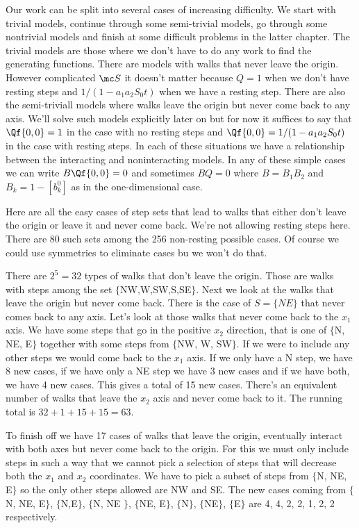 Our work can be split into several cases of increasing difficulty. We start with trivial models, continue through some semi-trivial models, go through some nontrivial models and finish at some difficult problems in the latter chapter. The trivial models are those where we don't have to do any work to find the generating functions. There are models with walks that never leave the origin. However complicated $\mc S$ it doesn't matter because $Q = 1$ when we don't have resting steps and $1/(1-a_1a_2S_0t)$ when we have a resting step. There are also the semi-triviall models where walks leave the origin but never come back to any axis. We'll solve such models explicitly later on but for now it suffices to say that $\Qf{0,0} = 1$ in the case with no resting steps and $\Qf{0,0} = 1/(1-a_1a_2S_0t)$ in the case with resting steps. In each of these situations we have a relationship between the interacting and noninteracting models. In any of these simple cases we can write $B\Qf{0,0} = 0$ and sometimes $BQ = 0$ where $B = B_1 B_2$ and $B_k = 1-[b_k^0]$ as in the one-dimensional case.

Here are all the easy cases of step sets that lead to walks that either don't leave the origin or leave it and never come back. We're not allowing resting steps here. There are 80 such sets among the 256 non-resting possible cases. Of course we could use symmetries to eliminate cases bu we won't do that.

There are $2^5 = 32$ types of walks that don't leave the origin. Those are walks with steps among the set $\{$NW,W,SW,S,SE$\}$. Next we look at the walks that leave the origin but never come back.  There is the case of $S = \{NE\}$ that never comes back to any axis. Let's look at those walks that never come back to the $x_1$ axis. We have some steps that go in the positive $x_2$ direction, that is one of $\{$N, NE, E$\}$ together with some steps from $\{$NW, W, SW$\}$. If we were to include any other steps we would come back to the $x_1$ axis. If we only have a N step, we have 8 new cases, if we have only a NE step we have 3 new cases and if we have both, we have 4 new cases. This gives a total of 15 new cases. There's an equivalent number of walks that leave the $x_2$ axis and never come back to it. The running total is $32 + 1  + 15 + 15 = 63$.

To finish off we have 17 cases of walks that leave the origin, eventually interact with both axes but never come back to the origin. For this we must only include steps in such a way that we cannot pick a selection of steps that will decrease both the $x_1$ and $x_2$ coordinates. We have to pick a subset of steps from $\{$N, NE, E$\}$ so the only other steps allowed are NW and SE. The new cases coming from $\{$N, NE, E$\}$, $\{$N,E$\}$, $\{$N, NE $\}$, $\{$NE, E$\}$, $\{$N$\}$, $\{$NE$\}$, $\{$E$\}$ are 4, 4, 2, 2, 1, 2, 2 respectively.

